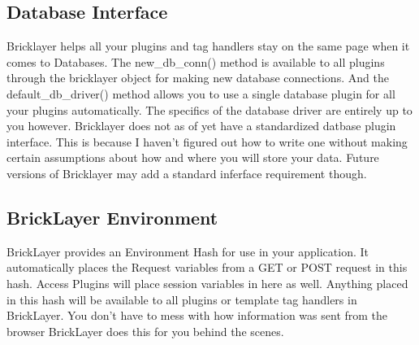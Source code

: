 \documentclass[letterpaper,10pt,oneside]{book}
\begin{document}
\subsection*{Database Interface}
Bricklayer helps all your plugins and tag handlers stay on the same page when it comes to Databases. The new\_db\_conn() method is available to all plugins through the bricklayer object for making new database connections. And the default\_db\_driver() method allows you to use a single database plugin for all your plugins automatically. The specifics of the database driver are entirely up to you however. Bricklayer does not as of yet have a standardized datbase plugin interface. This is because I haven't figured out how to write one without making certain assumptions about how and where you will store your data. Future versions of Bricklayer may add a standard inferface requirement though.
\subsection{BrickLayer Environment}
BrickLayer provides an Environment Hash for use in your application. It automatically places the Request variables from a GET or POST request in this hash. Access Plugins will place session variables in here as well. Anything placed in this hash will be available to all plugins or template tag handlers in BrickLayer. You don't have to mess with how information was sent from the browser BrickLayer does this for you behind the scenes.
\end{document}
